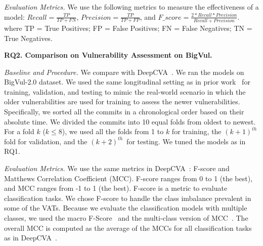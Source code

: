 \emph{Evaluation Metrics.} We use the following metrics to measure the
effectiveness of a model: $Recall = \frac{TP}{TP+FN}$, $Precision =
\frac{TP}{TP+FP}$, and $F\_score =
\frac{2*Recall*Precision}{Recall+Precision}$.
where TP = True Positives; FP = False Positives; FN = False Negatives; TN = True Negatives.


\noindent\textbf{RQ2. Comparison on Vulnerability Assessment on BigVul.}

{\em Baseline and Procedure.} We compare {\tool} with
DeepCVA~\cite{deepCVA-ase21}. We ran the models on BigVul-2.0
dataset. We used the same longitudinal setting as in prior
work~\cite{deepCVA-ase21,falessi2020need} for training, validation,
and testing to mimic the real-world scenario in which the older
vulnerabilities are used for training to assess the newer
vulnerabilities. Specifically, we sorted all the commits in a
chronological order based on their absolute time. We divided the
commits into 10 equal folds from oldest to newest. For a fold $k$ ($k
\le 8$), we used all the folds from 1 to $k$ for training, the
$(k+1)^{th}$ fold for validation, and the $(k+2)^{th}$~for testing. We
tuned the models as in RQ1.



\emph{Evaluation Metrics.} We use the same metrics in
DeepCVA~\cite{deepCVA-ase21}: F-score and Matthews Correlation
Coefficient (MCC). F-score ranges from 0 to 1 (the best), and MCC
ranges from -1 to 1 (the best). F-score is a metric to evaluate
classification tasks. We chose F-score to handle the class imbalance
prevalent in some of the VATs. Because we evaluate the classification
models with multiple classes, we used the macro
F-Score~\cite{SPANOS-jss18} and the multi-class version of
MCC~\cite{gorodkin04}. The overall MCC is computed as the average of
the MCCs for all classification tasks as in DeepCVA~\cite{deepCVA-ase21}.

